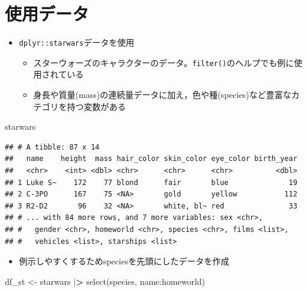 \documentclass[
  xelatex,ja=standard, b5paper]{bxjsbook}
\newenvironment{Shaded}{\begin{snugshade}}{\end{snugshade}}
\newcommand{\ErrorTok}[1]{\textcolor[rgb]{0.64,0.00,0.00}{\textbf{#1}}}
\newcommand{\FunctionTok}[1]{\textcolor[rgb]{0.00,0.00,0.00}{#1}}
\newcommand{\NormalTok}[1]{#1}
\newcommand{\OtherTok}[1]{\textcolor[rgb]{0.56,0.35,0.01}{#1}}
\newcommand{\SpecialCharTok}[1]{\textcolor[rgb]{0.00,0.00,0.00}{#1}}
\providecommand{\tightlist}{%
  \setlength{\itemsep}{0pt}\setlength{\parskip}{0pt}}
\begin{document}
\hypertarget{ux4f7fux7528ux30c7ux30fcux30bf}{%
\section{使用データ}\label{ux4f7fux7528ux30c7ux30fcux30bf}}

\begin{itemize}
\tightlist
\item
  \texttt{dplyr::starwars}データを使用

  \begin{itemize}
  \tightlist
  \item
    スターウォーズのキャラクターのデータ。\texttt{filter()}のヘルプでも例に使用されている
  \item
    身長や質量(mass)の連続量データに加え，色や種(species)など豊富なカテゴリを持つ変数がある
  \end{itemize}
\end{itemize}

\begin{Shaded}
\begin{Highlighting}[]
\NormalTok{starwars}
\end{Highlighting}
\end{Shaded}

\begin{verbatim}
## # A tibble: 87 x 14
##   name    height  mass hair_color skin_color eye_color birth_year
##   <chr>    <int> <dbl> <chr>      <chr>      <chr>          <dbl>
## 1 Luke S~    172    77 blond      fair       blue              19
## 2 C-3PO      167    75 <NA>       gold       yellow           112
## 3 R2-D2       96    32 <NA>       white, bl~ red               33
## # ... with 84 more rows, and 7 more variables: sex <chr>,
## #   gender <chr>, homeworld <chr>, species <chr>, films <list>,
## #   vehicles <list>, starships <list>
\end{verbatim}

\begin{itemize}
\tightlist
\item
  例示しやすくするためspeciesを先頭にしたデータを作成
\end{itemize}

\begin{Shaded}
\begin{Highlighting}[]
\NormalTok{df\_st }\OtherTok{\textless{}{-}} 
\NormalTok{  starwars }\SpecialCharTok{|}\ErrorTok{\textgreater{}} 
  \FunctionTok{select}\NormalTok{(species, name}\SpecialCharTok{:}\NormalTok{homeworld)}
\end{Highlighting}
\end{Shaded}
\end{document}
